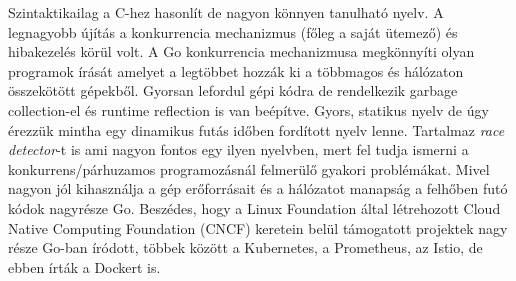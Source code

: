 Szintaktikailag a C-hez hasonlít de nagyon könnyen tanulható nyelv.
A legnagyobb újítás a konkurrencia mechanizmus (főleg a saját ütemező) és hibakezelés körül volt.
A Go konkurrencia mechanizmusa megkönnyíti olyan programok írását amelyet a legtöbbet hozzák ki a többmagos és hálózaton összekötött gépekből.
Gyorsan lefordul gépi kódra de rendelkezik garbage collection-el és runtime reflection is van beépítve.
Gyors, statikus nyelv de úgy érezzük mintha egy dinamikus futás időben fordított nyelv lenne.
Tartalmaz \textit{race detector}-t is ami nagyon fontos egy ilyen nyelvben, mert fel tudja ismerni a konkurrens/párhuzamos programozásnál felmerülő gyakori problémákat.
Mivel nagyon jól kihasználja a gép erőforrásait és a hálózatot manapság a felhőben futó kódok nagyrésze Go.
Beszédes, hogy a Linux Foundation által létrehozott Cloud Native Computing Foundation (CNCF) keretein
belül támogatott projektek nagy része Go-ban íródott, többek között a Kubernetes, a Prometheus, az Istio, de ebben írták a Dockert is.


